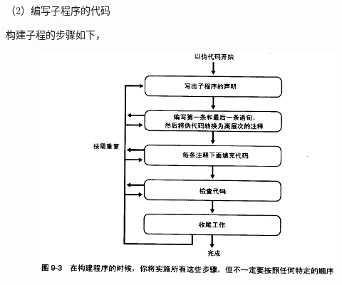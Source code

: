 \documentclass{article}
\begin{document}
\par
（2）编写子程序的代码
\par
构建子程的步骤如下，
\begin{figure}
    \centering
    \includegraphics[width=15cm]{figure14.PNG}
\end{figure}
\end{document}
